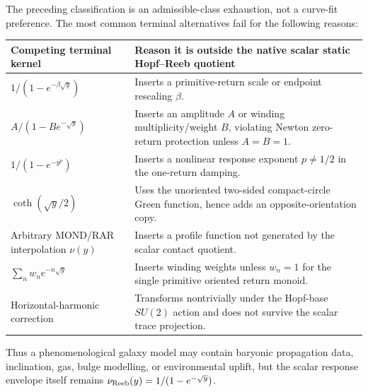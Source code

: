 \documentclass[12pt,a4paper]{article}
\begin{document}
\begin{remark}
\label{p8:rem:excluded-rar-response-alternatives}
The preceding classification is an admissible-class exhaustion, not a curve-fit preference.  The most common terminal alternatives fail for the following reasons:
\begin{center}
\begin{tabularx}{\textwidth}{@{}>{\raggedright\arraybackslash}p{}>{\raggedright\arraybackslash}X@{}}
\toprule
Competing terminal kernel & Reason it is outside the native scalar static Hopf--Reeb quotient \\
\midrule
\(1/(1-e^{-\beta\sqrt y})\) & Inserts a primitive-return scale or endpoint rescaling \(\beta\). \\
\(A/(1-Be^{-\sqrt y})\) & Inserts an amplitude \(A\) or winding multiplicity/weight \(B\), violating Newton zero-return protection unless \(A=B=1\). \\
\(1/(1-e^{-y^p})\) & Inserts a nonlinear response exponent \(p\ne1/2\) in the one-return damping. \\
\(\coth(\sqrt y/2)\) & Uses the unoriented two-sided compact-circle Green function, hence adds an opposite-orientation copy. \\
Arbitrary MOND/RAR interpolation \(\nu(y)\) & Inserts a profile function not generated by the scalar contact quotient. \\
\(\sum_n w_n e^{-n\sqrt y}\) & Inserts winding weights unless \(w_n=1\) for the single primitive oriented return monoid. \\
Horizontal-harmonic correction & Transforms nontrivially under the Hopf-base \(SU(2)\) action and does not survive the scalar trace projection. \\
\bottomrule
\end{tabularx}
\end{center}
Thus a phenomenological galaxy model may contain baryonic propagation data, inclination, gas, bulge modelling, or environmental uplift, but the scalar response envelope itself remains \(\nu_{\rm Reeb}(y)=1/(1-e^{-\sqrt y})\).
\end{remark}
\end{document}
